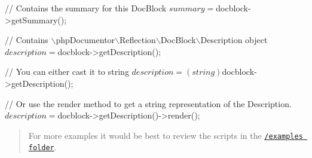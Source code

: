 \begin{DoxyCode}
\textcolor{comment}{// Contains the summary for this DocBlock}
$summary = $docblock->getSummary();

\textcolor{comment}{// Contains \(\backslash\)phpDocumentor\(\backslash\)Reflection\(\backslash\)DocBlock\(\backslash\)Description object}
$description = $docblock->getDescription();

\textcolor{comment}{// You can either cast it to string}
$description = (string) $docblock->getDescription();

\textcolor{comment}{// Or use the render method to get a string representation of the Description.}
$description = $docblock->getDescription()->render();
\end{DoxyCode}


\begin{quote}
For more examples it would be best to review the scripts in the \href{/examples}{\tt {\ttfamily /examples} folder}.\end{quote}
